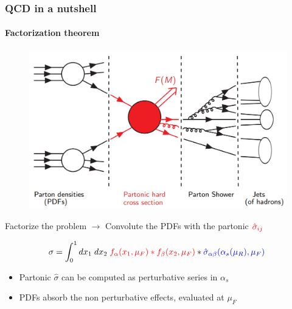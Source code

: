\documentclass[aspectratio=43]{beamer}
\begin{document}
\begin{frame}
	
	\frametitle{QCD in a nutshell}
	\framesubtitle{Factorization theorem}
	
	\begin{figure}
		\includegraphics[width = 8 cm]{plots/factorization_2.png}
	\end{figure}

	Factorize the problem $\longrightarrow$ Convolute the {\color{blue}PDFs} with the partonic ${\color{red}\hat{\sigma}_{i j}}$
	
	\begin{equation}
		\sigma = \int_{0}^{1} dx_{1} \; dx_{2} \; {\color{red} f_{\alpha}(x_{1}, \mu_{F}) \ast f_{\beta}(x_{2}, \mu_{F})} \ast {\color{blue}\hat{\sigma}_{\alpha \beta}(\alpha_{s}(\mu_{R}), \mu_{F})} \; \nonumber
	\end{equation}
	
	\begin{itemize}
		\item Partonic {\color{red}$\hat{\sigma}$} can be computed as perturbative series in $\alpha_{s}$
		\item {\color{blue}PDFs} absorb the non perturbative effects, evaluated at $\mu_{F}$
	\end{itemize}
	
\end{frame}
\end{document}

